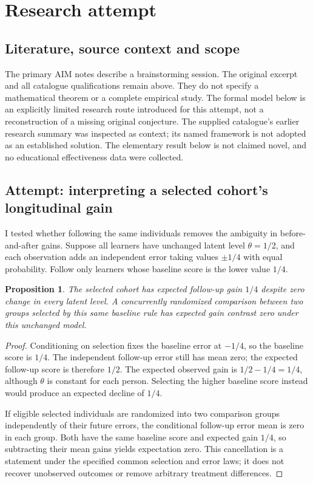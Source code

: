 \documentclass[11pt]{article}
\newtheorem{proposition}{Proposition}
\begin{document}
\section{Research attempt}
\subsection{Literature, source context and scope}
The primary AIM notes describe a brainstorming session. The original excerpt and all catalogue qualifications remain above. They do not specify a mathematical theorem or a complete empirical study. The formal model below is an explicitly limited research route introduced for this attempt, not a reconstruction of a missing original conjecture. The supplied catalogue's earlier research summary was inspected as context; its named framework is not adopted as an established solution. The elementary result below is not claimed novel, and no educational effectiveness data were collected.

\subsection{Attempt: interpreting a selected cohort's longitudinal gain}
I tested whether following the same individuals removes the ambiguity in before-and-after gains. Suppose all learners have unchanged latent level $\theta=1/2$, and each observation adds an independent error taking values $\pm1/4$ with equal probability. Follow only learners whose baseline score is the lower value $1/4$.
\begin{proposition}
The selected cohort has expected follow-up gain $1/4$ despite zero change in every latent level. A concurrently randomized comparison between two groups selected by this same baseline rule has expected gain contrast zero under this unchanged model.
\end{proposition}
\begin{proof}
Conditioning on selection fixes the baseline error at $-1/4$, so the baseline score is $1/4$. The independent follow-up error still has mean zero; the expected follow-up score is therefore $1/2$. The expected observed gain is $1/2-1/4=1/4$, although $\theta$ is constant for each person. Selecting the higher baseline score instead would produce an expected decline of $1/4$.

If eligible selected individuals are randomized into two comparison groups independently of their future errors, the conditional follow-up error mean is zero in each group. Both have the same baseline score and expected gain $1/4$, so subtracting their mean gains yields expectation zero. This cancellation is a statement under the specified common selection and error laws; it does not recover unobserved outcomes or remove arbitrary treatment differences.
\end{proof}
\end{document}
